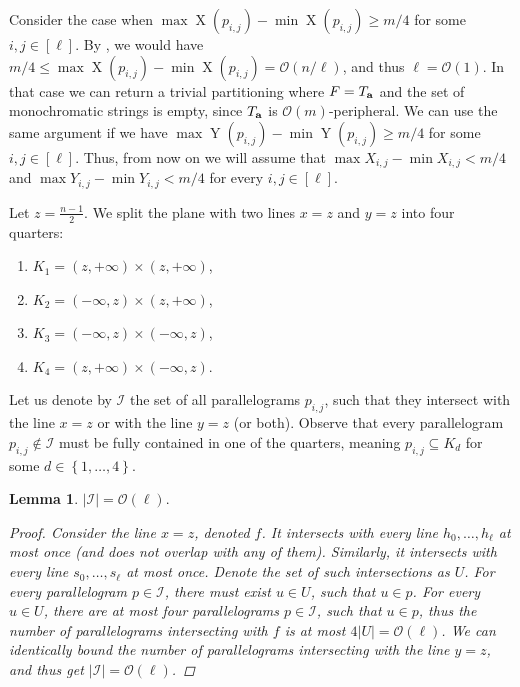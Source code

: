 \documentclass[11pt, letterpaper]{article}
\theoremstyle{plain}
\newtheorem{lemma}{Lemma}
\theoremstyle{definition}
\theoremstyle{remark}
\renewcommand{\O}{\mathcal{O}}
\newcommand{\set}[1]{\left\lbrace #1 \right\rbrace}
\DeclareMathOperator*{\X}{X}
\DeclareMathOperator*{\Y}{Y}
\begin{document}
Consider the case when $\max \X(p_{i, j}) - \min \X(p_{i, j}) \ge m / 4$ for some $i, j \in [\ell]$.
By , we would have $m / 4 \le \max \X(p_{i, j}) - \min \X(p_{i, j}) = \O(n / \ell)$, and thus $\ell = \O(1)$.
In that case we can return a trivial partitioning where $F = T_\mathbf{a}$ and the set of monochromatic strings is empty, since $T_\mathbf{a}$ is $\O(m)$-peripheral.
We can use the same argument if we have $\max \Y(p_{i, j}) - \min \Y(p_{i, j}) \ge m / 4$ for some $i, j \in [\ell]$.
Thus, from now on we will assume that $\max X_{i, j} - \min X_{i, j} < m / 4$ and $\max Y_{i, j} - \min Y_{i, j} < m / 4$ for every $i, j \in [\ell]$. 

Let $z = \frac{n - 1}{2}$. 
We split the plane with two lines $x = z$ and $y = z$ into four quarters:
\begin{enumerate}[1)]
	\item $K_1 = (z, +\infty) \times (z, +\infty)$,
	\item $K_2 = (-\infty, z) \times (z, +\infty)$,
	\item $K_3 = (-\infty, z) \times (-\infty, z)$,
	\item $K_4 = (z, +\infty) \times (-\infty, z)$.
\end{enumerate}
\newcommand{\I}{\mathcal{I}}
\newcommand{\G}{\mathcal{G}}
\newcommand{\C}{\mathcal{C}}
Let us denote by $\I$ the set of all parallelograms $p_{i, j}$, such that they intersect with the line $x = z$ or with the line $y = z$ (or both).
Observe that every parallelogram $p_{i, j} \not \in \I$ must be fully contained in one of the quarters, meaning $p_{i, j} \subseteq K_d$ for some $d \in \set{1, \dots, 4}$.

\begin{lemma}\label{I_size_bound}
	$|\I| = \O(\ell).$
	\begin{proof}
		Consider the line $x = z$, denoted $f$.
		It intersects with every line $h_0, \dots, h_\ell$ at most once (and does not overlap with any of them).
		Similarly, it intersects with every line $s_0, \dots, s_\ell$ at most once.
		Denote the set of such intersections as $U$.
		For every parallelogram $p \in \I$, there must exist $u \in U$, such that $u \in p$.
		For every $u \in U$, there are at most four parallelograms $p \in \I$, such that $u \in p$,
		thus the number of parallelograms intersecting with $f$ is at most $4|U| = \O(\ell)$.
		We can identically bound the number of parallelograms intersecting with the line $y = z$, and thus get $|\I| = \O(\ell)$.
	\end{proof}
\end{lemma}
\end{document}
